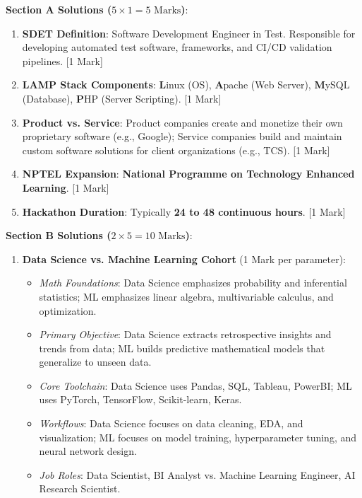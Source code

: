 \begin{solutionbox}
\noindent\textbf{Section A Solutions ($5 \times 1 = 5\text{ Marks}$)}:
\begin{enumerate}
    \item \textbf{SDET Definition}: Software Development Engineer in Test. Responsible for developing automated test software, frameworks, and CI/CD validation pipelines. [1 Mark]
    \item \textbf{LAMP Stack Components}: \textbf{L}inux (OS), \textbf{A}pache (Web Server), \textbf{M}ySQL (Database), \textbf{P}HP (Server Scripting). [1 Mark]
    \item \textbf{Product vs. Service}: Product companies create and monetize their own proprietary software (e.g., Google); Service companies build and maintain custom software solutions for client organizations (e.g., TCS). [1 Mark]
    \item \textbf{NPTEL Expansion}: \textbf{National Programme on Technology Enhanced Learning}. [1 Mark]
    \item \textbf{Hackathon Duration}: Typically \textbf{24 to 48 continuous hours}. [1 Mark]
\end{enumerate}

\medskip
\noindent\textbf{Section B Solutions ($2 \times 5 = 10\text{ Marks}$)}:
\begin{enumerate}[start=6]
    \item \textbf{Data Science vs. Machine Learning Cohort} (1 Mark per parameter):
    \begin{itemize}
        \item \textit{Math Foundations}: Data Science emphasizes probability and inferential statistics; ML emphasizes linear algebra, multivariable calculus, and optimization.
        \item \textit{Primary Objective}: Data Science extracts retrospective insights and trends from data; ML builds predictive mathematical models that generalize to unseen data.
        \item \textit{Core Toolchain}: Data Science uses Pandas, SQL, Tableau, PowerBI; ML uses PyTorch, TensorFlow, Scikit-learn, Keras.
        \item \textit{Workflows}: Data Science focuses on data cleaning, EDA, and visualization; ML focuses on model training, hyperparameter tuning, and neural network design.
        \item \textit{Job Roles}: Data Scientist, BI Analyst vs. Machine Learning Engineer, AI Research Scientist.
    \end{itemize}


\end{enumerate}
\end{solutionbox}
